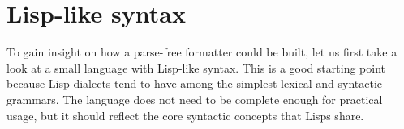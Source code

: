 \chapter{Lisp-like syntax}
To gain insight on how a parse-free formatter could be built,
let us first take a look at a small language with Lisp-like syntax.
This is a good starting point because Lisp dialects tend to
have among the simplest lexical and syntactic grammars.
The language does not need to be complete enough for practical usage,
but it should reflect the core syntactic concepts that Lisps share.








